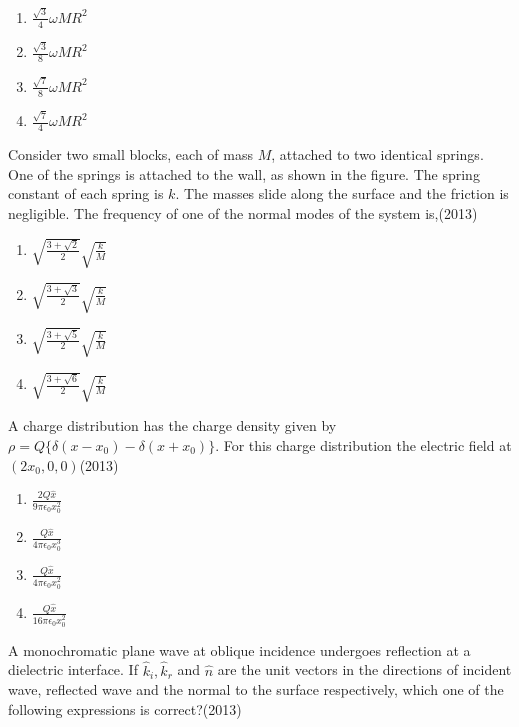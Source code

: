   \begin{multicols}{4}
			\begin{enumerate}
\item $\frac{\sqrt{3}}{4} \omega M R^{2}$
\item $\frac{\sqrt{3}}{8} \omega M R^{2}$
\item $\frac{\sqrt{7}}{8} \omega M R^{2}$
\item $\frac{\sqrt{7}}{4} \omega M R^{2}$
\end{enumerate}
		\end{multicols}
  \item Consider two small blocks, each of mass $M$, attached to two identical springs. One of the springs is attached to the wall, as shown in the figure. The spring constant of each spring is $k$. The masses slide along the surface and the friction is negligible. The frequency of one of the normal modes of the system is,\hfill{(2013)}

  
   \begin{multicols}{4}
			\begin{enumerate}
  \item$\sqrt{\frac{3+\sqrt{2}}{2}} \sqrt{\frac{k}{M}}$
\item $\sqrt{\frac{3+\sqrt{3}}{2}} \sqrt{\frac{k}{M}}$
\item$\sqrt{\frac{3+\sqrt{5}}{2}} \sqrt{\frac{k}{M}}$
\item $\sqrt{\frac{3+\sqrt{6}}{2}} \sqrt{\frac{k}{M}}$
\end{enumerate}
		\end{multicols}
  
\item    A charge distribution has the charge density given by $\rho=Q\{\delta(x-x_{0})-\delta(x+x_{0})\}$. For this charge distribution the electric field at $(2 x_{0}, 0,0)$\hfill{(2013)}

\begin{multicols}{4}
			\begin{enumerate}

\item  $\frac{2 Q \hat{x}}{9 \pi \epsilon_{0} x_{0}^{2}}$
\item  $\frac{Q \hat{x}}{4 \pi \epsilon_{0} x_{0}^{3}}$
\item  $\frac{{Q} \hat{x}}{4 \pi \epsilon_{0} x_{0}^{2}}$
\item  $\frac{{Q} \hat{{x}}}{16 \pi \epsilon_{0} x_{0}^{2}}$
   \end{enumerate}
		\end{multicols}
  \item   A monochromatic plane wave at oblique incidence undergoes reflection at a dielectric interface. If $\hat{k}_{i}, \hat{k}_{r}$ and $\hat{n}$ are the unit vectors in the directions of incident wave, reflected wave and the normal to the surface respectively, which one of the following expressions is correct?\hfill{(2013)}

